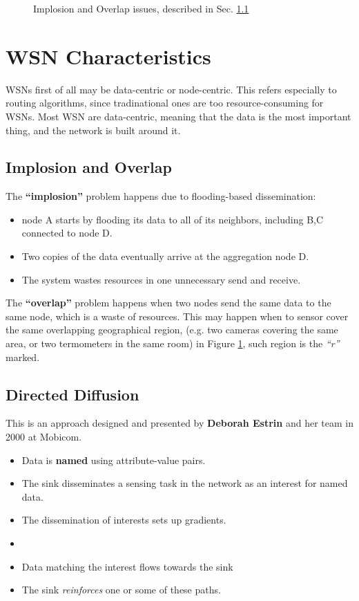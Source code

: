 \begin{paracol}{2}
\begin{figure}[htbp]
   \caption{Implosion and Overlap issues, described in Sec. \ref{sec:implosionoverlap}}
   \label{fig:wsn_implosionoverlap}
\end{figure}
\end{paracol}

\section{WSN Characteristics}
WSNs first of all may be data-centric or node-centric. This refers especially to routing algorithms, since tradinational ones are too resource-consuming for WSNs.
Most WSN are data-centric, meaning that the data is the most important thing, and the network is built around it.

\subsection{Implosion and Overlap}
\label{sec:implosionoverlap}
The \textbf{``implosion''} problem happens due to flooding-based dissemination:
\begin{itemize}
   \item node A starts by flooding its data to all of its neighbors, including B,C connected to node D.
   \item Two copies of the data eventually arrive at
   the aggregation node D.
   \item The system wastes resources in one
   unnecessary send and receive.
\end{itemize}

The \textbf{``overlap''} problem happens when two nodes send the same data to the same node, which is a waste of resources. 
This may happen when to sensor cover the same overlapping geographical region, (e.g. two cameras covering the same area, or two termometers in the same room) in Figure \ref{fig:wsn_implosionoverlap}, such region is the \textit{``r''} marked.

\subsection{Directed Diffusion}
This is an approach designed and presented by \textbf{Deborah Estrin} and her team in 2000 at Mobicom.

\begin{itemize}
   \item Data is \textbf{named} using attribute-value pairs.
   \item The sink disseminates a sensing task in the network as an interest for named data.
   \item The dissemination of interests sets up gradients.
   \item {}
   \item Data matching the interest flows towards the sink
   \item The sink \textit{reinforces} one or some of these paths.
\end{itemize}

